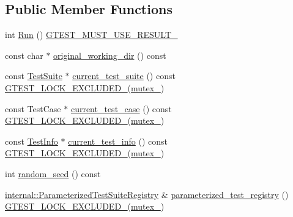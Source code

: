 \subsection*{Public Member Functions}
\begin{DoxyCompactItemize}
\item 
int \hyperlink{classtesting_1_1UnitTest_a2febc800536b44500565f4c423f359d3}{Run} () \hyperlink{gtest-port_8h_a8e5aab8276b2645f64f41c9e3021b935}{G\+T\+E\+S\+T\+\_\+\+M\+U\+S\+T\+\_\+\+U\+S\+E\+\_\+\+R\+E\+S\+U\+L\+T\+\_\+}
\item 
const char $\ast$ \hyperlink{classtesting_1_1UnitTest_af35839566385e14f6b31232489112621}{original\+\_\+working\+\_\+dir} () const
\item 
const \hyperlink{classtesting_1_1TestSuite}{Test\+Suite} $\ast$ \hyperlink{classtesting_1_1UnitTest_ac1c9ccf54060771c27fb94c3955459d3}{current\+\_\+test\+\_\+suite} () const \hyperlink{gtest-port_8h_a69abff5a4efdd07bd5faebe3dd318d06}{G\+T\+E\+S\+T\+\_\+\+L\+O\+C\+K\+\_\+\+E\+X\+C\+L\+U\+D\+E\+D\+\_\+}(\hyperlink{classtesting_1_1UnitTest_abb94ef45cf0ab43be81ac6d5b1364132}{mutex\+\_\+})
\item 
const Test\+Case $\ast$ \hyperlink{classtesting_1_1UnitTest_a158da6213cf0b2c6100e9cb1f8151e63}{current\+\_\+test\+\_\+case} () const \hyperlink{gtest-port_8h_a69abff5a4efdd07bd5faebe3dd318d06}{G\+T\+E\+S\+T\+\_\+\+L\+O\+C\+K\+\_\+\+E\+X\+C\+L\+U\+D\+E\+D\+\_\+}(\hyperlink{classtesting_1_1UnitTest_abb94ef45cf0ab43be81ac6d5b1364132}{mutex\+\_\+})
\item 
const \hyperlink{classtesting_1_1TestInfo}{Test\+Info} $\ast$ \hyperlink{classtesting_1_1UnitTest_a02b6ab72bb9d93805bd0efbb099b4ccc}{current\+\_\+test\+\_\+info} () const \hyperlink{gtest-port_8h_a69abff5a4efdd07bd5faebe3dd318d06}{G\+T\+E\+S\+T\+\_\+\+L\+O\+C\+K\+\_\+\+E\+X\+C\+L\+U\+D\+E\+D\+\_\+}(\hyperlink{classtesting_1_1UnitTest_abb94ef45cf0ab43be81ac6d5b1364132}{mutex\+\_\+})
\item 
int \hyperlink{classtesting_1_1UnitTest_adddc090a06f2d3a0e68f3762ee262688}{random\+\_\+seed} () const
\item 
\hyperlink{classtesting_1_1internal_1_1ParameterizedTestSuiteRegistry}{internal\+::\+Parameterized\+Test\+Suite\+Registry} \& \hyperlink{classtesting_1_1UnitTest_a3f72b753a9eda20bf7ab2aef0bdcc40f}{parameterized\+\_\+test\+\_\+registry} () \hyperlink{gtest-port_8h_a69abff5a4efdd07bd5faebe3dd318d06}{G\+T\+E\+S\+T\+\_\+\+L\+O\+C\+K\+\_\+\+E\+X\+C\+L\+U\+D\+E\+D\+\_\+}(\hyperlink{classtesting_1_1UnitTest_abb94ef45cf0ab43be81ac6d5b1364132}{mutex\+\_\+})

\end{DoxyCompactItemize}
